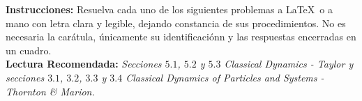 

\usepackage{fancyhdr}%
\pagestyle{fancy}%
\fancyhead{}
\fancyhead[R]{\footnotesize{\thepage}}
\fancyfoot{}
\usepackage{fourier-orns}

\renewcommand\footrule{%
\hrulefill
\raisebox{-2.1pt}
{\quad\decosix\quad}%
\hrulefill}


\begin{titlepage}


\noindent \textbf{Instrucciones: } Resuelva cada uno de los siguientes problemas a \LaTeX $\,$ o a mano con letra clara y legible, dejando constancia de sus procedimientos. No es necesaria la carátula, únicamente su identificaciónn y las respuestas encerradas en un cuadro. \\
\textbf{Lectura Recomendada:} \textit{Secciones $5.1$, $5.2$ y $5.3$ Classical Dynamics - Taylor y secciones $3.1$, $3.2$, $3.3$ y $3.4$ Classical Dynamics of Particles and Systems - Thornton \& Marion.}



\end{titlepage}

